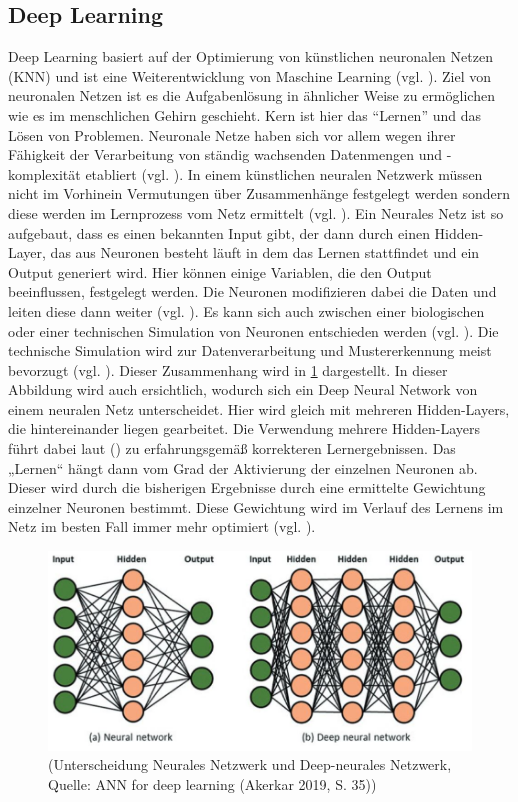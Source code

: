 \subsection{Deep Learning}
Deep Learning basiert auf der Optimierung von künstlichen neuronalen Netzen (KNN) und ist eine Weiterentwicklung von Maschine Learning (vgl. \cite[S. 1]{Georgevici.2019}). Ziel von neuronalen Netzen ist es die Aufgabenlösung in ähnlicher Weise zu ermöglichen wie es im menschlichen Gehirn geschieht. Kern ist hier das “Lernen” und das Lösen von Problemen. Neuronale Netze haben sich vor allem wegen ihrer Fähigkeit der Verarbeitung von ständig wachsenden Datenmengen und -komplexität etabliert (vgl. \cite[S. 373]{Welsch.2018}). In einem künstlichen neuralen Netzwerk müssen nicht im Vorhinein Vermutungen über Zusammenhänge festgelegt werden sondern diese werden im Lernprozess vom Netz ermittelt (vgl. \cite[S. 581]{Backhaus.2018b}). Ein Neurales Netz ist 
so aufgebaut, dass es einen bekannten Input gibt, der dann durch einen Hidden-Layer, das aus Neuronen besteht läuft in dem das Lernen stattfindet und ein Output generiert wird. Hier können einige Variablen, die den Output 
beeinflussen, festgelegt werden. 
Die Neuronen modifizieren dabei die Daten und leiten diese dann weiter (vgl. \cite[S. 373]{Welsch.2018}). Es kann sich auch zwischen einer biologischen oder einer technischen Simulation von Neuronen entschieden werden (vgl. \cite{https:www.facebook.comspektrumverlag.04.12.2014}). Die technische Simulation wird zur Datenverarbeitung und Mustererkennung meist bevorzugt (vgl. \cite{https:www.facebook.comspektrumverlag.04.12.2014}). Dieser Zusammenhang wird in \ref{fig:NeuralVsDeepNeural} dargestellt. 
In dieser Abbildung wird auch ersichtlich, wodurch sich ein Deep Neural Network von einem neuralen Netz unterscheidet. Hier wird gleich mit mehreren Hidden-Layers, die hintereinander liegen gearbeitet. Die Verwendung mehrere Hidden-Layers führt dabei laut (\cite[S. 581]{Backhaus.2018b}) zu erfahrungsgemäß korrekteren Lernergebnissen. Das „Lernen“ hängt dann vom Grad der Aktivierung der einzelnen Neuronen ab. Dieser wird durch die bisherigen Ergebnisse durch eine ermittelte Gewichtung einzelner Neuronen bestimmt. Diese Gewichtung wird im Verlauf des Lernens im Netz im besten Fall immer mehr optimiert (vgl. \cite[S. 586]{Backhaus.2018b}).
\begin{figure}[ht]
\centering
\includegraphics[width=\linewidth]{pics/ANN_for_deep_learning_P35}
\caption{(Unterscheidung Neurales Netzwerk und Deep-neurales Netzwerk, Quelle: ANN for deep learning (Akerkar 2019, S. 35))}
\label{fig:NeuralVsDeepNeural}
\end{figure}
